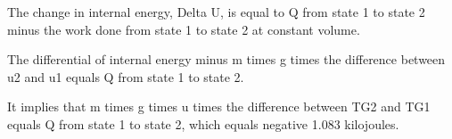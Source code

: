 The change in internal energy, Delta U, is equal to Q from state 1 to state 2 minus the work done from state 1 to state 2 at constant volume.

The differential of internal energy minus m times g times the difference between u2 and u1 equals Q from state 1 to state 2.

It implies that m times g times u times the difference between TG2 and TG1 equals Q from state 1 to state 2, which equals negative 1.083 kilojoules.